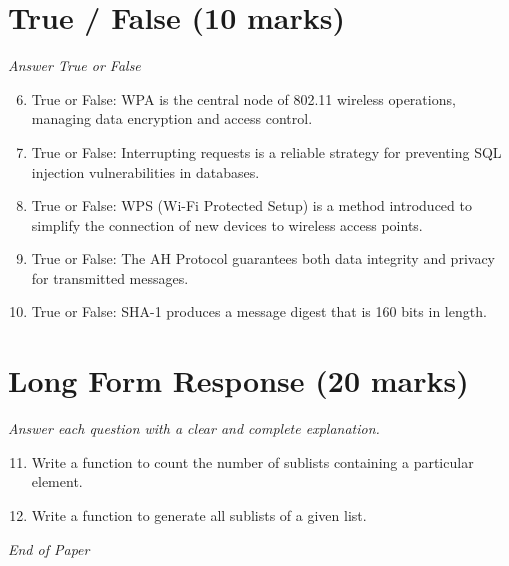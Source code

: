 \documentclass[12pt]{article}
\begin{document}
\section*{True / False (10 marks)}
\textit{Answer True or False}
\begin{enumerate}[label=\arabic*.]
\setcounter{enumi}{5}
\item True or False: WPA is the central node of 802.11 wireless operations, managing data encryption and access control.
\item True or False: Interrupting requests is a reliable strategy for preventing SQL injection vulnerabilities in databases.
\item True or False: WPS (Wi-Fi Protected Setup) is a method introduced to simplify the connection of new devices to wireless access points.
\item True or False: The AH Protocol guarantees both data integrity and privacy for transmitted messages.
\item True or False: SHA-1 produces a message digest that is 160 bits in length.
\end{enumerate}

\section*{Long Form Response (20 marks)}
\textit{Answer each question with a clear and complete explanation.}
\begin{enumerate}[label=\arabic*.]
\setcounter{enumi}{10}
\item Write a function to count the number of sublists containing a particular element.
\item Write a function to generate all sublists of a given list.
\end{enumerate}

\vfill
\noindent\textit{End of Paper}
\end{document}
